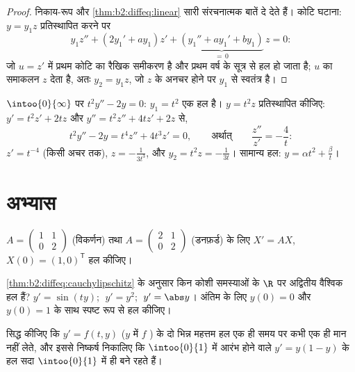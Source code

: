 \begin{proof}
निकाय-रूप और \cref{thm:b2:diffeq:linear} सारी संरचनात्मक बातें दे देते हैं। कोटि घटाना: $y = y_1z$
प्रतिस्थापित करने पर
\[
y_1 z'' + (2y_1' + a y_1)z' + \underbrace{(y_1'' + ay_1' +
by_1)}_{=\,0}\,z = 0 :
\]
जो $u = z'$ में प्रथम कोटि का रैखिक समीकरण है और प्रथम वर्ष के सूत्र से हल हो
जाता है; $u$ का समाकलन $z$ देता है, अतः $y_2 = y_1 z$, जो $z$ के अनचर होने पर $y_1$ से
स्वतंत्र है।
\end{proof}

\begin{example}\label{ex:b2:diffeq:lowering}
$\intoo{0}{\infty}$ पर $t^2y'' - 2y = 0$: $y_1 = t^2$ एक हल है। $y = t^2z$ प्रतिस्थापित कीजिए: $y' = t^2z' + 2tz$ और $y''
= t^2z'' + 4tz' + 2z$ से,
\[
t^2y'' - 2y = t^4 z'' + 4t^3z' = 0,
\qquad\text{अर्थात्}\qquad \frac{z''}{z'} = -\frac4t :
\]
$z' = t^{-4}$ (किसी अचर तक), $z = -\frac{1}{3t^3}$, और $y_2
= t^2z = -\frac{1}{3t}$। सामान्य हल: $y = \alpha t^2 +
\frac{\beta}{t}$।
\end{example}

\section{अभ्यास}

\begin{exercise}[$\star$]\label{exo:b2:diffeq:1}
$A =
\begin{pmatrix} 1 & 1\\ 0 & 2\end{pmatrix}$ (विकर्णन) तथा $A =
\begin{pmatrix} 2 & 1\\ 0 & 2 \end{pmatrix}$ (डनफ़र्ड) के लिए $X' = AX$, $X(0) = (1, 0)^{\mathsf T}$ हल कीजिए।
\end{exercise}

\begin{exercise}[$\star$]\label{exo:b2:diffeq:2}
\cref{thm:b2:diffeq:cauchylipschitz} के अनुसार किन कोशी समस्याओं के $\R$ पर अद्वितीय वैश्विक हल हैं? $y' = \sin(ty)$;
$\;y' =
y^2$; $\;y' = \abs y$। अंतिम के लिए $y(0) =
0$ और $y(0) = 1$ के साथ स्पष्ट रूप से हल कीजिए।
\end{exercise}

\begin{exercise}[$\star$]\label{exo:b2:diffeq:3}
सिद्ध कीजिए कि $y' = f(t,y)$ ($y$ में $f$ ) के दो भिन्न महत्तम हल एक ही
समय पर कभी एक ही मान नहीं लेते, और इससे निष्कर्ष निकालिए कि $\intoo{0}{1}$ में आरंभ
होने वाले $y' = y(1 - y)$ के हल सदा $\intoo{0}{1}$ में ही बने रहते हैं।
\end{exercise}

